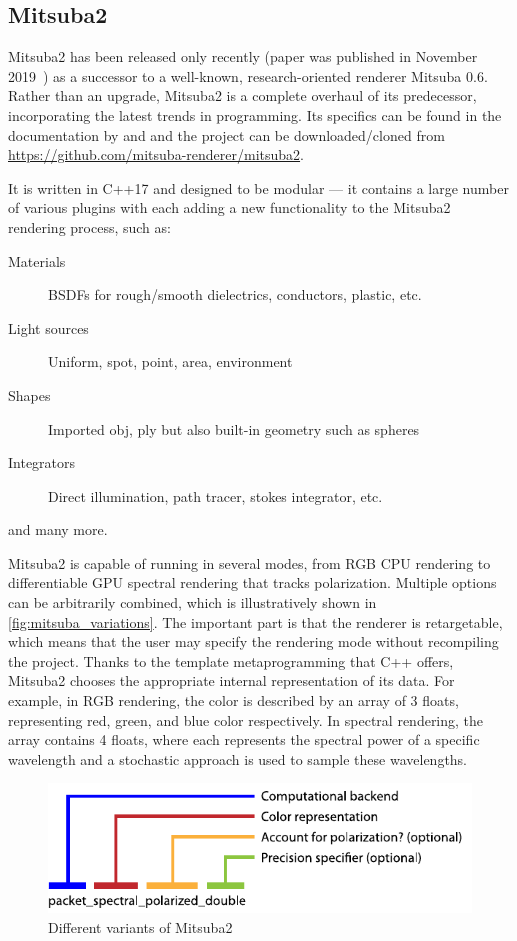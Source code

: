 \subsection{Mitsuba2}

Mitsuba2 has been released only recently (paper was published in November 2019~\cite{nimier2019mitsuba}) as a successor to a well-known, research-oriented renderer Mitsuba 0.6. Rather than an upgrade, Mitsuba2 is a complete overhaul of its predecessor, incorporating the latest trends in programming. Its specifics can be found in the documentation by \citet{mitsubaWeb} and \citet{nimier2019mitsuba} and the project can be downloaded/cloned from \url{https://github.com/mitsuba-renderer/mitsuba2}.

It is written in C++17 and designed to be modular --- it contains a large number of various plugins with each adding a new functionality to the Mitsuba2 rendering process, such as:

\begin{description}
	\item[Materials] BSDFs for rough/smooth dielectrics, conductors, plastic, etc.
	\item[Light sources] Uniform, spot, point, area, environment
	\item[Shapes] Imported obj, ply but also built-in geometry such as spheres
	\item[Integrators] Direct illumination, path tracer, stokes integrator, etc.
\end{description}

and many more.

Mitsuba2 is capable of running in several modes, from RGB CPU rendering to differentiable GPU spectral rendering that tracks polarization. Multiple options can be arbitrarily combined, which is illustratively shown in \autoref{fig:mitsuba_variations}. The important part is that the renderer is retargetable, which means that the user may specify the rendering mode without recompiling the project. Thanks to the template metaprogramming that C++ offers, Mitsuba2 chooses the appropriate internal representation of its data. For example, in RGB rendering, the color is described by an array of 3 floats, representing red, green, and blue color respectively. In spectral rendering, the array contains 4 floats, where each represents the spectral power of a specific wavelength and a stochastic approach is used to sample these wavelengths.

\begin{figure}
	\centering
	\includegraphics[width=0.8\linewidth]{img/mitsuba_variants.pdf}
	\caption{Different variants of Mitsuba2}
	\label{fig:mitsuba_variations}
\end{figure}

